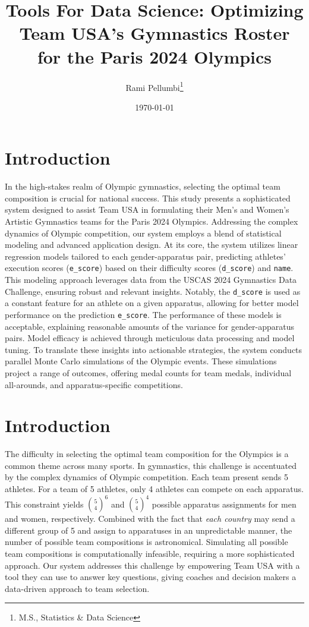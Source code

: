 \documentclass{article}
\title{Tools For Data Science: Optimizing Team USA's Gymnastics Roster for the Paris 2024 Olympics}
\author{Rami Pellumbi\thanks{M.S., Statistics \& Data Science}}
\date{\today}
\begin{document}
\maketitle
\newpage
\section{Introduction}
In the high-stakes realm of Olympic gymnastics, selecting the optimal team 
composition is crucial for national success. This study presents a 
sophisticated system designed to assist Team USA in formulating their Men's 
and Women's Artistic Gymnastics teams for the Paris 2024 Olympics. Addressing 
the complex dynamics of Olympic competition, our system employs a blend 
of statistical modeling and advanced application design. 
At its core, the system utilizes linear regression models tailored 
to each gender-apparatus pair, predicting athletes' execution scores (\texttt{e\_score}) 
based on their difficulty scores (\texttt{d\_score}) and \texttt{name}. 
This modeling approach leverages data from the USCAS 2024 Gymnastics Data 
Challenge, ensuring robust and relevant insights. Notably, 
the \texttt{d\_score} is used as a constant feature for an athlete on a given 
apparatus, allowing for better model performance on the prediction \texttt{e\_score}.
The performance of these models is acceptable, explaining 
reasonable amounts of the variance for gender-apparatus pairs. Model efficacy is 
achieved through meticulous data processing and model tuning.
To translate these insights into actionable strategies, the system 
conducts parallel Monte Carlo simulations of the Olympic events. These simulations 
project a range of outcomes, offering medal counts for team medals, 
individual all-arounds, and apparatus-specific competitions.

\section{Introduction}
The difficulty in selecting the optimal team composition for the Olympics 
is a common theme across many sports. In gymnastics, this challenge is 
accentuated by the complex dynamics of Olympic competition. Each team present 
sends 5 athletes. For a team of 5 athletes, only 4 athletes can compete on each apparatus. 
This constraint yields ${5 \choose 4}^6$ and ${5 \choose 4}^4$ possible apparatus assignments for 
men and women, respectively. Combined with the fact that \textit{each country} may 
send a different group of 5 and assign to apparatuses in an unpredictable manner, 
the number of possible team compositions is astronomical. 
Simulating all possible team compositions is computationally infeasible, 
requiring a more sophisticated approach. Our system addresses this challenge 
by empowering Team USA with a tool they can use to answer key questions, 
giving coaches and decision makers a data-driven approach to team selection.
\end{document}
